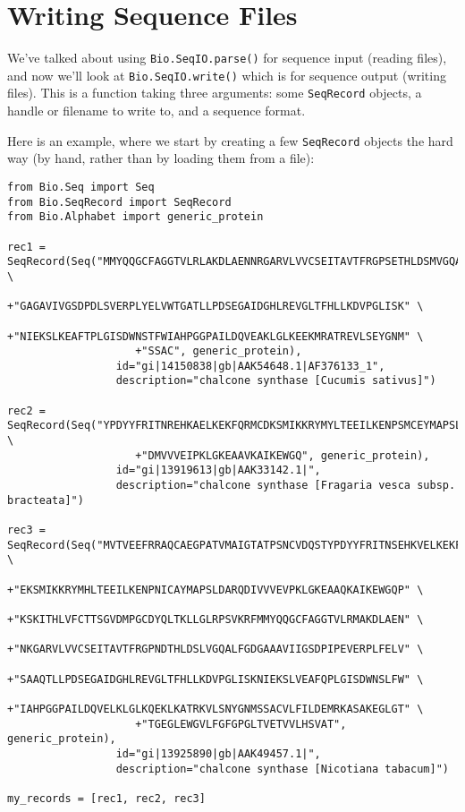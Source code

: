 \section{Writing Sequence Files}

We've talked about using \verb|Bio.SeqIO.parse()| for sequence input (reading files), and now we'll look at \verb|Bio.SeqIO.write()| which is for sequence output (writing files).  This is a function taking three arguments: some \verb|SeqRecord| objects, a handle or filename to write to, and a sequence format.

Here is an example, where we start by creating a few \verb|SeqRecord| objects the hard way (by hand, rather than by loading them from a file):

\begin{verbatim}
from Bio.Seq import Seq
from Bio.SeqRecord import SeqRecord
from Bio.Alphabet import generic_protein

rec1 = SeqRecord(Seq("MMYQQGCFAGGTVLRLAKDLAENNRGARVLVVCSEITAVTFRGPSETHLDSMVGQALFGD" \
                    +"GAGAVIVGSDPDLSVERPLYELVWTGATLLPDSEGAIDGHLREVGLTFHLLKDVPGLISK" \
                    +"NIEKSLKEAFTPLGISDWNSTFWIAHPGGPAILDQVEAKLGLKEEKMRATREVLSEYGNM" \
                    +"SSAC", generic_protein),
                 id="gi|14150838|gb|AAK54648.1|AF376133_1",
                 description="chalcone synthase [Cucumis sativus]")

rec2 = SeqRecord(Seq("YPDYYFRITNREHKAELKEKFQRMCDKSMIKKRYMYLTEEILKENPSMCEYMAPSLDARQ" \
                    +"DMVVVEIPKLGKEAAVKAIKEWGQ", generic_protein),
                 id="gi|13919613|gb|AAK33142.1|",
                 description="chalcone synthase [Fragaria vesca subsp. bracteata]")

rec3 = SeqRecord(Seq("MVTVEEFRRAQCAEGPATVMAIGTATPSNCVDQSTYPDYYFRITNSEHKVELKEKFKRMC" \
                    +"EKSMIKKRYMHLTEEILKENPNICAYMAPSLDARQDIVVVEVPKLGKEAAQKAIKEWGQP" \
                    +"KSKITHLVFCTTSGVDMPGCDYQLTKLLGLRPSVKRFMMYQQGCFAGGTVLRMAKDLAEN" \
                    +"NKGARVLVVCSEITAVTFRGPNDTHLDSLVGQALFGDGAAAVIIGSDPIPEVERPLFELV" \
                    +"SAAQTLLPDSEGAIDGHLREVGLTFHLLKDVPGLISKNIEKSLVEAFQPLGISDWNSLFW" \
                    +"IAHPGGPAILDQVELKLGLKQEKLKATRKVLSNYGNMSSACVLFILDEMRKASAKEGLGT" \
                    +"TGEGLEWGVLFGFGPGLTVETVVLHSVAT", generic_protein),
                 id="gi|13925890|gb|AAK49457.1|",
                 description="chalcone synthase [Nicotiana tabacum]")

my_records = [rec1, rec2, rec3]
\end{verbatim}

